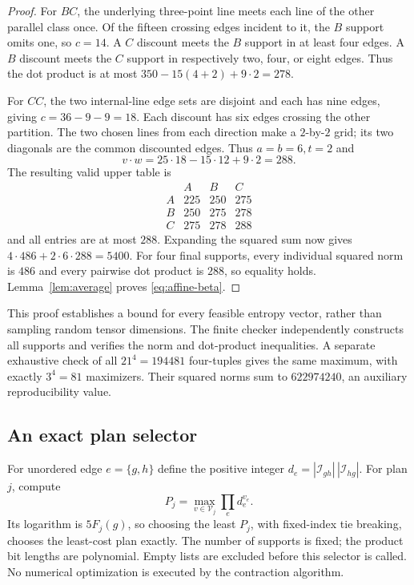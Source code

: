 \begin{proof}
For $BC$, the underlying three-point line meets each line of the other
parallel class once. Of the fifteen crossing edges incident to it, the
$B$ support omits one, so $c=14$. A $C$ discount meets the $B$ support
in at least four edges. A $B$ discount meets the $C$ support in respectively
two, four, or eight edges. Thus the dot product is at most
$350-15(4+2)+9\cdot2=278$.

For $CC$, the two internal-line edge sets are disjoint and each has nine
edges, giving $c=36-9-9=18$. Each discount has six edges crossing the other
partition. The two chosen lines from each direction make a $2$-by-$2$ grid;
its two diagonals are the common discounted edges. Thus $a=b=6,t=2$ and
\[
 v\cdot w=25\cdot18-15\cdot12+9\cdot2=288.
\]
The resulting valid upper table is
\[
\begin{array}{c|rrr}&A&B&C\\\hline
 A&225&250&275\\B&250&275&278\\C&275&278&288
\end{array}
\]
and all entries are at most $288$. Expanding the squared sum now gives
$4\cdot486+2\cdot6\cdot288=5400$.
For four final supports, every individual squared norm is $486$ and every pairwise
dot product is $288$, so equality holds. Lemma~\ref{lem:average} proves
\eqref{eq:affine-beta}.
\end{proof}

This proof establishes a bound for every feasible entropy vector, rather
than sampling random tensor dimensions. The finite checker independently
constructs all supports and verifies the norm and dot-product inequalities.
A separate exhaustive check of all $21^4=194481$ four-tuples gives the same
maximum, with exactly $3^4=81$ maximizers. Their squared norms sum to
$622974240$, an auxiliary reproducibility value.

\subsection{An exact plan selector}
For unordered edge $e=\{g,h\}$ define the positive integer
$d_e=|\mathcal I_{gh}|\,|\mathcal I_{hg}|$. For plan $j$, compute
\begin{equation}
 P_j=\max_{v\in\mathcal V_j}\prod_e d_e^{v_e}.\label{eq:selector}
\end{equation}
Its logarithm is $5F_j(g)$, so choosing the least $P_j$, with fixed-index
tie breaking, chooses the least-cost plan exactly. The number of supports
is fixed; the product bit lengths are polynomial. Empty lists are excluded
before this selector is called. No numerical optimization is executed by
the contraction algorithm.

